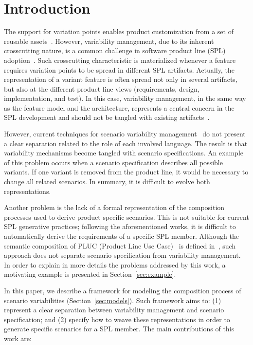 \section{Introduction}
%
The support for variation points enables product
customization from a set of reusable
assets~\cite{phol-spl-book}. However, variability management, due to
its inherent crosscutting nature, is a common challenge in software
product line (SPL) adoption~\cite{northrop-spl-book,phol-spl-book}.
Such crosscutting characteristic is materialized whenever a feature
requires variation points to be spread in different SPL artifacts. Actually, 
the representation of a variant feature is often spread not only 
in several artifacts, but also at the different product line views (requirements, 
design, implementation, and test). In this case, variability management, in 
the same way as the feature model and the architecture, represents a central concern in the SPL 
development and should not be tangled with existing artifacts~\cite{phol-spl-book}.   

However, current techniques for scenario variability 
management~\cite{favaro-icsr-98,bertolino-esec-2003,eriksson-splc-2005} do 
not present a clear separation related to the role of each involved language. 
The result is that variability mechanisms become tangled with scenario specifications. 
An example of this problem occurs when a scenario specification describes all possible variants. 
If one variant is removed from the product line, it would be necessary to change all related scenarios. 
In summary, it is difficult to evolve both representations. 

Another problem is the lack of a formal representation of the composition processes used 
to derive product specific scenarios. This is not suitable for current SPL generative 
practices; following the aforementioned works, it is difficult to automatically derive 
the requirements of a specific SPL member.  Although  the semantic composition of PLUC (Product 
Line Use Case)~\cite{bertolino-esec-2003} is defined in~\cite{fantechi-splc-2004}, such approach 
does not separate scenario specification from variability management. In order to explain in more details 
the problems addressed by this work, a motivating example is presented  in Section~\ref{sec:example}.  

In this paper, we describe a framework for modeling the composition 
process of scenario variabilities (Section~\ref{sec:models}). 
Such framework aims to: (1) represent a clear separation between variability management 
and scenario specification; and (2) specify how to weave these representations in order to generate
specific scenarios for a SPL member. The main contributions of this work are:

